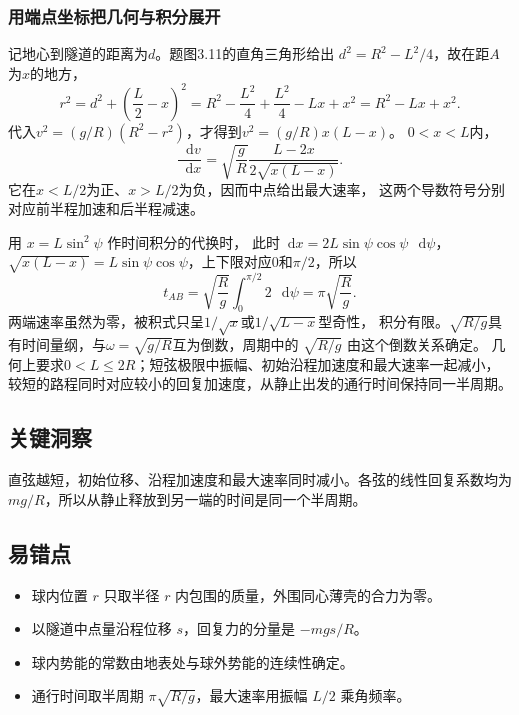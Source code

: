 \documentclass[UTF8,fontset=fandol,a4paper,11pt]{ctexart}
\newcommand{\dd}{\mathop{}\!\mathrm{d}}
\begin{document}
\subsubsection*{用端点坐标把几何与积分展开}
记地心到隧道的距离为$d$。题图3.11的直角三角形给出
$d^2=R^2-L^2/4$，故在距$A$为$x$的地方，
\[
r^2=d^2+\left(\frac L2-x\right)^2
=R^2-\frac{L^2}{4}+\frac{L^2}{4}-Lx+x^2
=R^2-Lx+x^2.
\]
代入$v^2=(g/R)(R^2-r^2)$，才得到$v^2=(g/R)x(L-x)$。
$0<x<L$内，
\[
\frac{\dd v}{\dd x}
=\sqrt{\frac gR}\frac{L-2x}{2\sqrt{x(L-x)}}.
\]
它在$x<L/2$为正、$x>L/2$为负，因而中点给出最大速率，
这两个导数符号分别对应前半程加速和后半程减速。

用 $x=L\sin^2\psi$ 作时间积分的代换时，
此时$\dd x=2L\sin\psi\cos\psi\,\dd\psi$，
$\sqrt{x(L-x)}=L\sin\psi\cos\psi$，上下限对应$0$和$\pi/2$，所以
\[
t_{AB}=\sqrt{\frac Rg}\int_0^{\pi/2}2\,\dd\psi
=\pi\sqrt{\frac Rg}.
\]
两端速率虽然为零，被积式只呈$1/\sqrt{x}$或$1/\sqrt{L-x}$型奇性，
积分有限。$
\sqrt{R/g}$具有时间量纲，与$\omega=\sqrt{g/R}$互为倒数，周期中的 $\sqrt{R/g}$ 由这个倒数关系确定。
几何上要求$0<L\leq2R$；短弦极限中振幅、初始沿程加速度和最大速率一起减小，
较短的路程同时对应较小的回复加速度，从静止出发的通行时间保持同一半周期。




\subsection*{关键洞察}

直弦越短，初始位移、沿程加速度和最大速率同时减小。各弦的线性回复系数均为 $mg/R$，所以从静止释放到另一端的时间是同一个半周期。



\subsection*{易错点}

\begin{itemize}
\item 球内位置 $r$ 只取半径 $r$ 内包围的质量，外围同心薄壳的合力为零。
\item 以隧道中点量沿程位移 $s$，回复力的分量是 $-mgs/R$。
\item 球内势能的常数由地表处与球外势能的连续性确定。
\item 通行时间取半周期 $\pi\sqrt{R/g}$，最大速率用振幅 $L/2$ 乘角频率。
\end{itemize}
\end{document}
